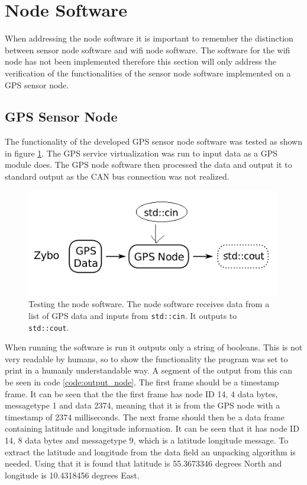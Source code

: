 \section{Node Software}
\label{sec:node_software}
When addressing the node software it is important to remember the distinction between sensor node software and wifi node software.
The software for the wifi node has not been implemented therefore this section will only address the verification of the functionalities of the sensor node software implemented on a GPS sensor node.

\subsection{GPS Sensor Node}
The functionality of the developed GPS sensor node software was tested as shown in figure \ref{fig:sensor_gps_veri}.
The GPS service virtualization was run to input data as a GPS module does. 
The GPS node software then processed the data and output it to standard output as the CAN bus connection was not realized.

\begin{figure}[h]
	\centering
	\includegraphics[width = 0.6\linewidth]{graphics/sensor_gps_veri}
	\caption{Testing the node software. The node software receives data from a list of GPS data and inputs from \texttt{std::cin}. It outputs to \texttt{std::cout}.}
	\label{fig:sensor_gps_veri}
\end{figure}

When running the software is run it outputs only a string of booleans. 
This is not very readable by humans, so to show the functionality the program was set to print in a humanly understandable way.
A segment of the output from this can be seen in code \ref{code:output_node}.
The first frame should be a timestamp frame.
It can be seen that the the first frame has node ID 14, 4 data bytes, messagetype 1 and data 2374, meaning that it is from the GPS node with a timestamp of 2374 milliseconds.
The next frame should then be a data frame containing latitude and longitude information.
It can be seen that it has node ID 14, 8 data bytes and messagetype 9, which is a latitude longitude message.
To extract the latitude and longitude from the data field an unpacking algorithm is needed.
Using that it is found that latitude is 55.3673346 degrees North and longitude is 10.4318456 degrees East.

